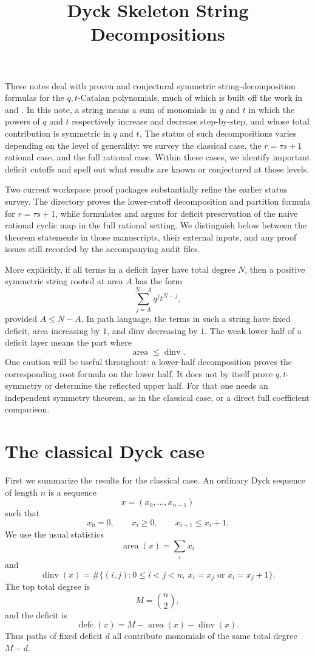 \documentclass[11pt]{article}
\title{Dyck Skeleton String Decompositions}
\author{}
\date{}
\newcommand{\area}{\operatorname{area}}
\newcommand{\dinv}{\operatorname{dinv}}
\newcommand{\defc}{\operatorname{defc}}
\begin{document}
\maketitle

These notes deal with proven and conjectural symmetric string-decomposition
formulas for the \(q,t\)-Catalan polynomials, much of which is built off the
work in \cite{Hawkes2026} and \cite{Hawkes2022}.  In this note, a string means
a sum of monomials in \(q\) and \(t\) in which the powers of \(q\) and \(t\)
respectively increase and decrease step-by-step, and whose total contribution
is symmetric in \(q\) and \(t\).  The status of such decompositions varies
depending on the level of generality: we survey the classical case, the
\(r=\tau s+1\) rational case, and the full rational case.  Within these cases,
we identify important deficit cutoffs and spell out what results are known or
conjectured at those levels.

Two current workspace proof packages substantially refine the earlier status
survey.  The directory
 proves the lower-cutoff decomposition and
partition formula for \(r=\tau s+1\), while
 formulates and argues for deficit
preservation of the naive rational cyclic map in the full rational setting.
We distinguish below between the theorem statements in those manuscripts,
their external inputs, and any proof issues still recorded by the accompanying
audit files.

More explicitly, if all terms in a deficit layer have total degree \(N\), then
a positive symmetric string rooted at area \(A\) has the form
\[
  \sum_{j=A}^{N-A} q^j t^{N-j},
\]
provided \(A\le N-A\).  In path language, the terms in such a string have fixed
deficit, area increasing by \(1\), and dinv decreasing by \(1\).  The weak lower
half of a deficit layer means the part where
\[
  \area \le \dinv.
\]
One caution will be useful throughout: a lower-half decomposition proves the
corresponding root formula on the lower half.  It does not by itself prove
\(q,t\)-symmetry or determine the reflected upper half.  For that one needs an
independent symmetry theorem, as in the classical case, or a direct full
coefficient comparison.

\section{The classical Dyck case}

First we summarize the results for the classical case.  An ordinary Dyck
sequence of length \(n\) is a sequence
\[
  x=(x_0,\ldots,x_{n-1})
\]
such that
\[
  x_0=0,\qquad x_i\ge 0,\qquad x_{i+1}\le x_i+1.
\]
We use the usual statistics
\[
  \area(x)=\sum_i x_i
\]
and
\[
  \dinv(x)=
  \#\{(i,j):0\le i<j<n,\ x_i=x_j
  \text{ or } x_i=x_j+1\}.
\]
The top total degree is
\[
  M=\binom n2,
\]
and the deficit is
\[
  \defc(x)=M-\area(x)-\dinv(x).
\]
Thus paths of fixed deficit \(d\) all contribute monomials of the same total
degree \(M-d\).
\end{document}
